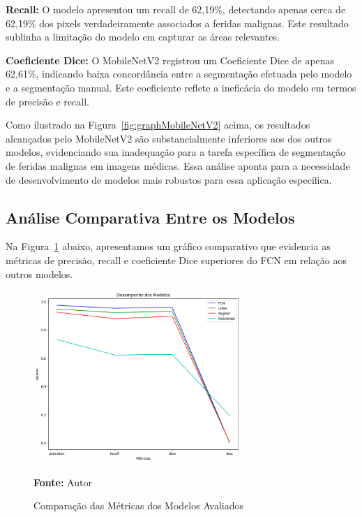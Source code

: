 \textbf{Recall:} O modelo apresentou um recall de 62,19\%, detectando apenas cerca de 62,19\% dos pixels verdadeiramente associados a feridas malignas. Este resultado sublinha a limitação do modelo em capturar as áreas relevantes.

\textbf{Coeficiente Dice:} O MobileNetV2 registrou um Coeficiente Dice de apenas 62,61\%, indicando baixa concordância entre a segmentação efetuada pelo modelo e a segmentação manual. Este coeficiente reflete a ineficácia do modelo em termos de precisão e recall.

Como ilustrado na Figura~\ref{fig:graphMobileNetV2} acima, os resultados alcançados pelo \ac{MobileNetV2} são substancialmente inferiores aos dos outros modelos, evidenciando sua inadequação para a tarefa específica de segmentação de feridas malignas em imagens médicas. Essa análise aponta para a necessidade de desenvolvimento de modelos mais robustos para essa aplicação específica.

\subsection{Análise Comparativa Entre os Modelos}
Na Figura~\ref{fig:graphResultsModels} abaixo, apresentamos um gráfico comparativo que evidencia as métricas de precisão, recall e coeficiente Dice superiores do \ac{FCN} em relação aos outros modelos. 

\begin{figure}[htbp]
    \centering
    \caption{Comparação das Métricas dos Modelos Avaliados}
    \includegraphics[width=0.7\textwidth]{img/results_metrics_models.png}
    \label{fig:graphResultsModels}
    \par\medskip\textbf{Fonte:} Autor
\end{figure}


